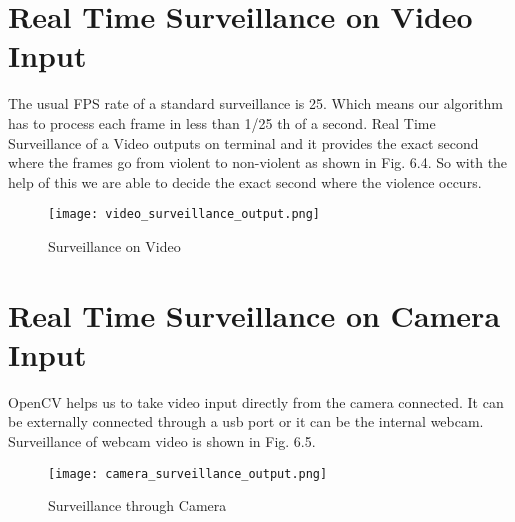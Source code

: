 \section{Real Time Surveillance on Video Input}
The usual FPS rate of a standard surveillance is 25. Which means our algorithm has to process each frame in less than 1/25 th of a second. Real Time Surveillance of a Video outputs on terminal and it provides the exact second where the frames go from violent to non-violent as shown in Fig. 6.4. So with the help of this we are able to decide the exact second where the violence occurs. 
\begin{figure}[H]
\centering
\texttt{[image: video\_surveillance\_output.png]}
\caption{Surveillance on Video}
\end{figure}
\section{Real Time Surveillance on Camera Input}
OpenCV helps us to take video input directly from the camera connected. It can be externally connected through a usb port or it can be the internal webcam. Surveillance of webcam video is shown in Fig. 6.5.
\begin{figure}[H]
\centering
\texttt{[image: camera\_surveillance\_output.png]}
\caption{Surveillance through Camera}
\end{figure}
